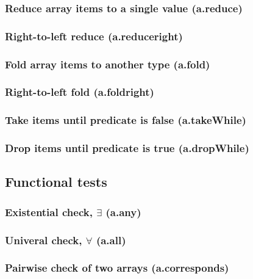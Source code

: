 \documentclass{article}
\theoremstyle{definition}
\begin{document}
\subsubsection{Reduce array items to a single value (a.reduce)}

\subsubsection{Right-to-left reduce (a.reduceright)}

\subsubsection{Fold array items to another type (a.fold)}

\subsubsection{Right-to-left fold (a.foldright)}

\subsubsection{Take items until predicate is false (a.takeWhile)}

\subsubsection{Drop items until predicate is true (a.dropWhile)}

\subsection{Functional tests}

\subsubsection{Existential check, $\exists$ (a.any)}

\subsubsection{Univeral check, $\forall$ (a.all)}

\subsubsection{Pairwise check of two arrays (a.corresponds)}
\end{document}
